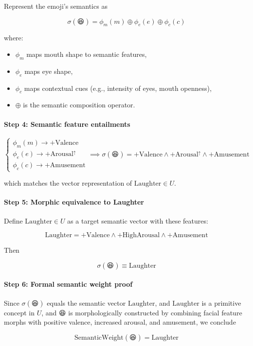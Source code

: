 \documentclass{article}
\begin{document}
Represent the emoji's semantics as

\[
\sigma(\text{😆}) = \phi_m(m) \oplus \phi_e(e) \oplus \phi_c(c)
\]

where:  
\begin{itemize}
    \item $\phi_m$ maps mouth shape to semantic features,
    \item $\phi_e$ maps eye shape,
    \item $\phi_c$ maps contextual cues (e.g., intensity of eyes, mouth openness),
    \item $\oplus$ is the semantic composition operator.
\end{itemize}

\paragraph{Step 4: Semantic feature entailments}

\[
\begin{cases}
\phi_m(m) \to +\mathrm{Valence} \\
\phi_e(e) \to +\mathrm{Arousal}^{\uparrow} \\
\phi_c(c) \to +\mathrm{Amusement}
\end{cases}
\implies
\sigma(\text{😆}) = +\mathrm{Valence} \wedge +\mathrm{Arousal}^{\uparrow} \wedge +\mathrm{Amusement}
\]

which matches the vector representation of $\mathrm{Laughter} \in U$.

\paragraph{Step 5: Morphic equivalence to Laughter}

Define $\mathrm{Laughter} \in U$ as a target semantic vector with these features:

\[
\mathrm{Laughter} = +\mathrm{Valence} \wedge +\mathrm{HighArousal} \wedge +\mathrm{Amusement}
\]

Then

\[
\sigma(\text{😆}) \equiv \mathrm{Laughter}
\]

\paragraph{Step 6: Formal semantic weight proof}

Since $\sigma(\text{😆})$ equals the semantic vector $\mathrm{Laughter}$, and $\mathrm{Laughter}$ is a primitive concept in $U$,  
and $\text{😆}$ is morphologically constructed by combining facial feature morphs with positive valence, increased arousal, and amusement,  
we conclude

\[
\boxed{
\mathrm{SemanticWeight}(\text{😆}) = \mathrm{Laughter}
}
\]
\end{document}
